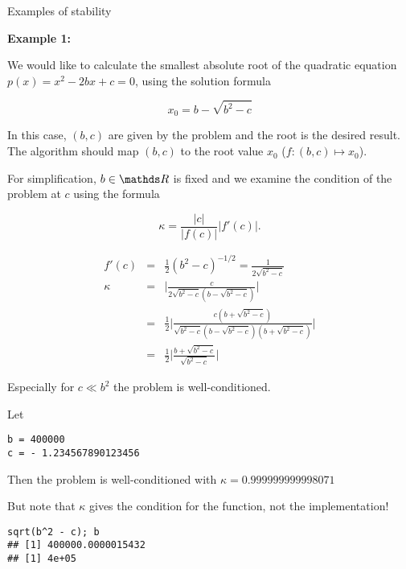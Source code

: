 \documentclass[11pt,compress,t,notes=noshow, xcolor=table]{beamer}
\begin{document}
\begin{vbframe}{Examples of stability}

\textbf{Example 1:}

We would like to calculate the smallest absolute root of the quadratic equation $p(x) = x^2 - 2 b x + c = 0$, using the solution formula

$$
x_0 = b - \sqrt{b^2 - c}
$$

In this case, $(b, c)$ are given by the problem and the root is the desired result. The algorithm should map $(b, c)$ to the root value $x_0$ ($f: (b, c)\mapsto x_0$).

\lz

For simplification, $b \in \R$ is fixed and we examine the condition of the problem at $c$ using the formula

$$
\kappa = \frac{|c|}{|f(c)|} |f'(c)|.
$$

\begin{eqnarray*}
f'(c) &=& \frac{1}{2} (b^2 - c)^{-1/2} = \frac{1}{2\sqrt{b^2 - c}} \\
\kappa &=& \bigg|\frac{c}{2\sqrt{b^2 - c}(b - \sqrt{b^2 - c})}\bigg| \\
&=& \frac{1}{2}\bigg| \frac{c (b + \sqrt{b^2 - c})}{\sqrt{b^2 - c}(b - \sqrt{b^2 - c})(b + \sqrt{b^2 - c})}\bigg| \\
&=& \frac{1}{2}\bigg|\frac{b + \sqrt{b^2 - c}}{\sqrt{b^2 - c}}\bigg| 
\end{eqnarray*}

Especially for $c \ll b^2$ the problem is well-conditioned.

\framebreak

Let
\vspace{0.2cm}
\footnotesize

\begin{verbatim}
b = 400000
c = - 1.234567890123456
\end{verbatim}

\normalsize
\vspace{0.2cm}
Then the problem is well-conditioned with $\kappa =  0.999999999998071$



\lz
But note that $\kappa$ gives the condition for the function, not the implementation!
\footnotesize
\vspace{0.2cm}
\begin{verbatim}
sqrt(b^2 - c); b
## [1] 400000.0000015432
## [1] 4e+05
\end{verbatim}


\end{vbframe}
\end{document}

